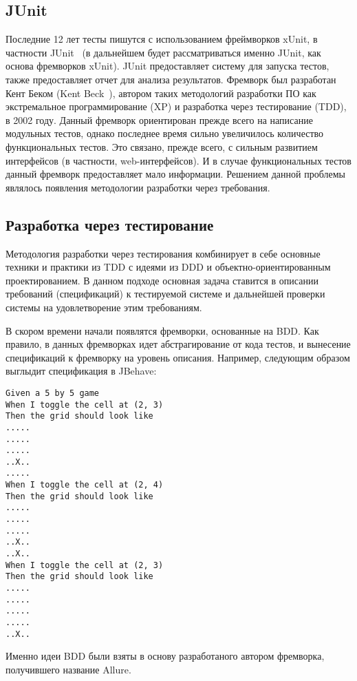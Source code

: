 \subsection{JUnit}

Последние 12 лет тесты пишутся с использованием фреймворков xUnit, в частности JUnit~\cite{junit_home} (в дальнейшем будет рассматриваться именно JUnit, как основа фремворков xUnit). JUnit предоставляет систему для запуска тестов, также предоставляет отчет для анализа результатов. 
Фремворк был разработан Кент Беком (Kent Beck~\cite{kent_beck}), автором таких методологий разработки ПО как экстремальное программирование (XP) и разработка через тестирование (TDD), в 2002 году. 
Данный фремворк ориентирован прежде всего на написание модульных тестов, однако последнее время сильно увеличилось количество функциональных тестов. Это связано, прежде всего, с сильным развитием интерфейсов (в частности, web-интерфейсов). И в случае функциональных тестов данный фремворк предоставляет мало информации. Решением данной проблемы являлось появления методологии разработки через требования.

\subsection{Разработка через тестирование}

Методология разработки через тестирования комбинирует в себе основные техники и практики из TDD с идеями из DDD и объектно-ориентированным проектированием. В данном подходе основная задача ставится в описании требований (спецификаций) к тестируемой системе и дальнейшей проверки системы на удовлетворение этим требованиям. 

В скором времени начали появлятся фремворки, основанные на BDD. Как правило, в данных фремворках идет абстрагирование от кода тестов, и вынесение спецификаций к фремворку на уровень описания. Например, следующим образом выглыдит спецификация в JBehave:

\begin{lstlisting}[caption=Пример спецификации JBehave]
Given a 5 by 5 game
When I toggle the cell at (2, 3)
Then the grid should look like
.....
.....
.....
..X..
.....
When I toggle the cell at (2, 4)
Then the grid should look like
.....
.....
.....
..X..
..X..
When I toggle the cell at (2, 3)
Then the grid should look like
.....
.....
.....
.....
..X..
\end{lstlisting}

Именно идеи BDD были взяты в основу разработаного автором фремворка, получившего название Allure.

